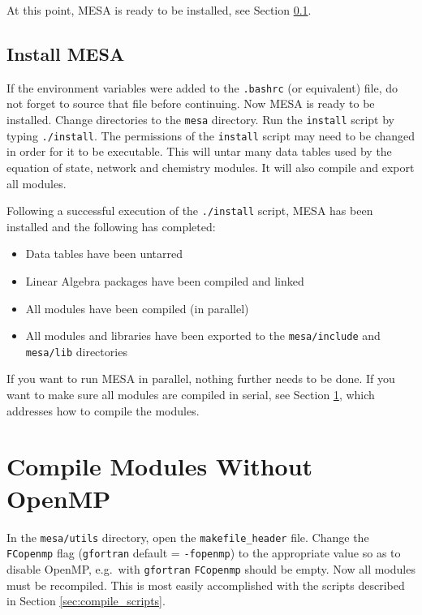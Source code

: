 At this point, {\sf MESA} is ready to be installed, see Section 
\ref{sec:install}.


\subsection{Install {\sf MESA}}
\label{sec:install}
If the environment variables were added to the {\tt .bashrc} (or equivalent) 
file, do not forget to source that file before continuing. Now {\sf MESA} 
is ready to be installed. Change directories to the {\tt mesa} directory. 
Run the {\tt install} script by typing {\tt ./install}. The permissions of the 
{\tt install} script may need to be changed in order for it to be executable.
This will untar many data tables used by the equation of state, network and 
chemistry modules. It will also compile and export all modules.

Following a successful execution of the {\tt ./install} script, 
{\sf MESA} has been installed and the following has completed:
\begin{itemize}
\item Data tables have been untarred
\item Linear Algebra packages have been compiled and linked
\item All modules have been compiled (in parallel)
\item All modules and libraries have been exported to the {\tt mesa/include} 
and {\tt mesa/lib} directories
\end{itemize}

If you want to run {\sf MESA} in parallel, nothing further needs to be done. 
If you want to make sure all modules are compiled in serial, see Section 
\ref{sec:compile_wo_omp}, which addresses how to compile the modules.

\section{Compile Modules Without OpenMP}
\label{sec:compile_wo_omp}

In the {\tt mesa/utils} directory, open the {\tt makefile\_header} file. 
Change the {\tt FCopenmp} flag ({\tt gfortran} default = {\tt -fopenmp}) to 
the appropriate value so as to disable OpenMP, e.g.\ with {\tt gfortran} 
{\tt FCopenmp} should be empty. Now all modules must be recompiled. This is 
most easily accomplished with the scripts described in Section 
\ref{sec:compile_scripts}.

